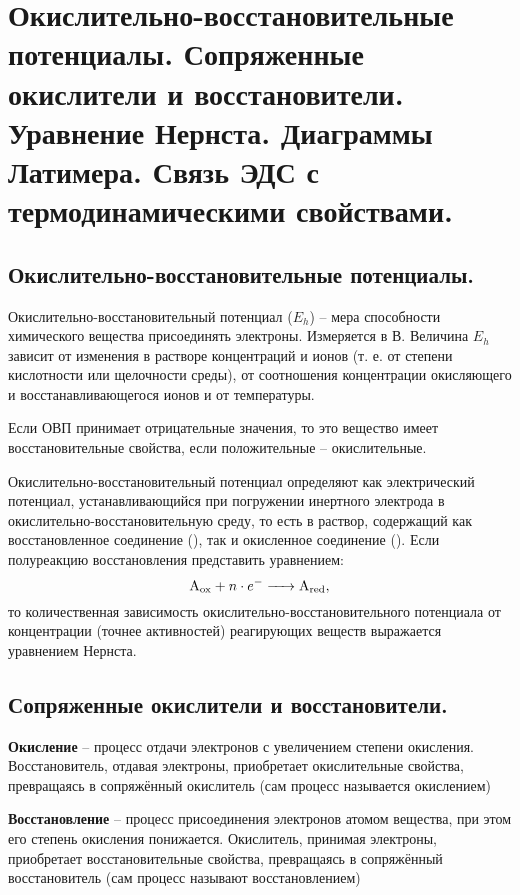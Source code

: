 \section{Окислительно-восстановительные потенциалы. Сопряженные окислители и восстановители. Уравнение Нернста. Диаграммы Латимера. Связь ЭДС с термодинамическими свойствами.}

\subsection{Окислительно-восстановительные потенциалы.}
Окислительно-восстановительный потенциал ($E_{h}$) -- мера способности химического вещества присоединять электроны. Измеряется в В. Величина $E_{h}$ зависит от изменения в растворе концентраций  и  ионов (т. е. от степени кислотности или щелочности среды), от соотношения концентрации окисляющего и восстанавливающегося ионов и от температуры. %

Если ОВП принимает отрицательные значения, то это вещество имеет восстановительные свойства, если положительные -- окислительные.

Окислительно-восстановительный потенциал определяют как электрический потенциал, устанавливающийся при погружении инертного электрода в окислительно-восстановительную среду, то есть в раствор, содержащий как восстановленное соединение (), так и окисленное соединение (). Если полуреакцию восстановления представить уравнением:
\begin{equation*}
	\ce{A_{ox}} + n\cdot e^{-} \ce{-> A_{red}},
\end{equation*}
то количественная зависимость окислительно-восстановительного потенциала от концентрации (точнее активностей) реагирующих веществ выражается уравнением Нернста.

\subsection{Сопряженные окислители и восстановители.}
\textbf{Окисление} -- процесс отдачи электронов с увеличением степени окисления.
Восстановитель, отдавая электроны, приобретает окислительные свойства, превращаясь в сопряжённый окислитель (сам процесс называется окислением)

\textbf{Восстановление} -- процесс присоединения электронов атомом вещества, при этом его степень окисления понижается.
Окислитель, принимая электроны, приобретает восстановительные свойства, превращаясь в сопряжённый восстановитель (сам процесс называют восстановлением)

